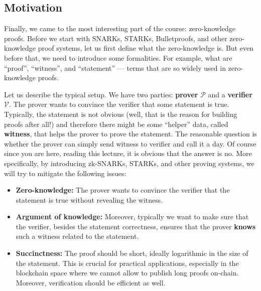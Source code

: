 \documentclass[../lecture-notes-148x210.tex]{subfiles}
\begin{document}
\subsection{Motivation}

Finally, we came to the most interesting part of the course: zero-knowledge
proofs. Before we start with SNARKs, STARKs, Bulletproofs, and other
zero-knowledge proof systems, let us first define what the zero-knowledge is.
But even before that, we need to introduce some formalities. For example, what
are ``proof'', ``witness'', and ``statement'' --- terms that are so widely used
in zero-knowledge proofs.

Let us describe the typical setup. We have two parties: \textbf{prover}
$\mathcal{P}$ and a \textbf{verifier} $\mathcal{V}$. The prover wants to
convince the verifier that some statement is true. Typically, the statement is
not obvious (well, that is the reason for building proofs after all!) and
therefore there might be some ``helper'' data, called \textbf{witness}, that
helps the prover to prove the statement. The reasonable question is whether the
prover can simply send witness to verifier and call it a day. Of course since
you are here, reading this lecture, it is obvious that the answer is no. More
specifically, by introducing zk-SNARKs, STARKs, and other proving systems, we
will try to mitigate the following issues:

\vspace{2mm}

\begin{itemize}
    \item \textbf{Zero-knowledge:} The prover wants to convince the verifier
    that the statement is true without revealing the witness. 
    \item \textbf{Argument of knowledge:} Moreover, typically we want to make
    sure that the verifier, besides the statement correctness, ensures that the
    prover \textbf{knows} such a witness related to the statement.
    \item \textbf{Succinctness:} The proof should be short, ideally logarithmic
    in the size of the statement. This is crucial for practical applications,
    especially in the blockchain space where we cannot allow to publish long
    proofs on-chain. Moreover, verification should be efficient as well.
\end{itemize}
\end{document}
